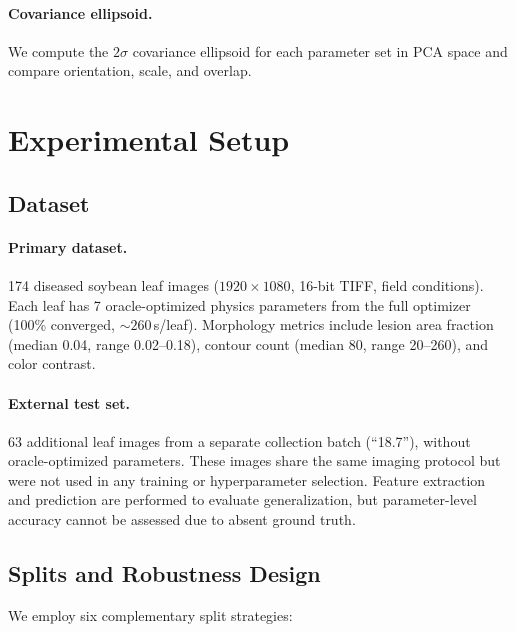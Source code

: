 \documentclass[11pt,a4paper]{article}
\begin{document}
\paragraph{Covariance ellipsoid.}
We compute the $2\sigma$ covariance ellipsoid for each parameter set
in PCA space and compare orientation, scale, and overlap.

\section{Experimental Setup}
\label{sec:experiments}

\subsection{Dataset}

\paragraph{Primary dataset.}
174 diseased soybean leaf images ($1920 \times 1080$, 16-bit TIFF,
field conditions). Each leaf has 7 oracle-optimized physics parameters
from the full optimizer (100\% converged, ${\sim}260$\,s/leaf).
Morphology metrics include lesion area fraction (median 0.04, range 0.02--0.18),
contour count (median 80, range 20--260), and color contrast.

\paragraph{External test set.}
63 additional leaf images from a separate collection batch (``18.7''),
without oracle-optimized parameters. These images share the same
imaging protocol but were not used in any training or hyperparameter selection.
Feature extraction and prediction are performed to evaluate generalization,
but parameter-level accuracy cannot be assessed due to absent ground truth.

\subsection{Splits and Robustness Design}

We employ six complementary split strategies:
\end{document}
